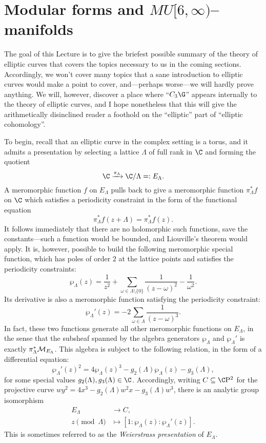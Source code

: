 









\section{Modular forms and \texorpdfstring{$MU[6, \infty)$}{MU[6, oo)}--manifolds}\label{SectionEllipticCurvesAndThetaFunctions}

The goal of this Lecture is to give the briefest possible summary of the theory of elliptic curves that covers the topics necessary to us in the coming sections.  Accordingly, we won't cover many topics that a sane introduction to elliptic curves would make a point to cover, and---perhaps worse---we will hardly prove anything.  We will, however, discover a place where ``$C_3 \G$'' appears internally to the theory of elliptic curves, and I hope nonetheless that this will give the arithmetically disinclined reader a foothold on the ``elliptic'' part of ``elliptic cohomology''.

To begin, recall that an elliptic curve in the complex setting is a torus, and it admits a presentation by selecting a lattice $\Lambda$ of full rank in $\C$ and forming the quotient \[\C \xrightarrow{\pi_\Lambda} \C / \Lambda =: E_\Lambda.\]  A meromorphic function $f$ on $E_\Lambda$ pulls back to give a meromorphic function $\pi_\Lambda^* f$ on $\C$ which satisfies a periodicity constraint in the form of the functional equation \[\pi_\Lambda^* f(z + \Lambda) = \pi_\Lambda^* f(z).\]  It follows immediately that there are no holomorphic such functions, save the constants---such a function would be bounded, and Liouville's theorem would apply.  It is, however, possible to build the following meromorphic special function, which has poles of order $2$ at the lattice points and satisfies the periodicity constraints: \[\wp_\Lambda(z) = \frac{1}{z^2} + \sum_{\omega \in \Lambda \setminus \{0\}} \frac{1}{(z - \omega)^2} - \frac{1}{\omega^2}.\]  Its derivative is also a meromorphic function satisfying the periodicity constraint: \[\wp_\Lambda'(z) = -2 \sum_{\omega \in \Lambda} \frac{1}{(z - \omega)^3}.\]  In fact, these two functions generate all other meromorphic functions on $E_\Lambda$, in the sense that the subsheaf spanned by the algebra generators $\wp_\Lambda$ and $\wp_\Lambda'$ is exactly $\pi_\Lambda^* \mathcal{M}_{E_\Lambda}$.  This algebra is subject to the following relation, in the form of a differential equation: \[\wp_\Lambda'(z)^2 = 4 \wp_\Lambda(z)^3 - g_2(\Lambda) \wp_\Lambda(z) - g_3(\Lambda),\] for some special values $g_2(\Lambda), g_3(\Lambda) \in \C$.  Accordingly, writing $C \subseteq \CP^2$ for the projective curve $wy^2 = 4x^3 - g_2(\Lambda) w^2 x - g_3(\Lambda) w^3$, there is an analytic group isomorphism
\begin{align*}
E_\Lambda & \to C, \\
z \pmod \Lambda & \mapsto [1: \wp_\Lambda(z): \wp_\Lambda'(z)].
\end{align*}
This is sometimes referred to as the \textit{Weierstrass presentation} of $E_\Lambda$.


